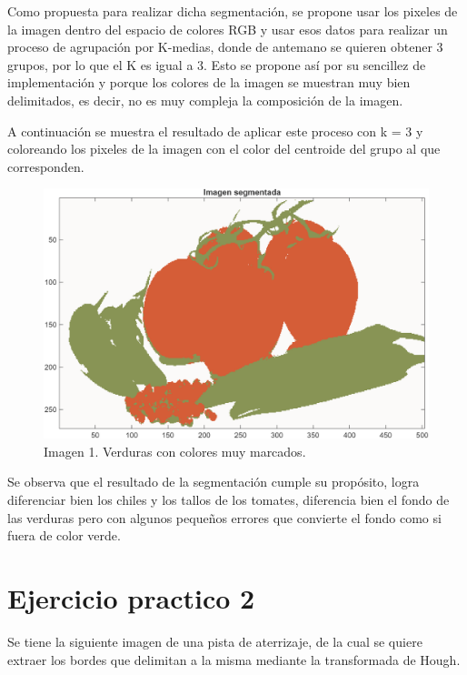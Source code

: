 \documentclass[11pt, letterpaper]{article}
\begin{document}
Como propuesta para realizar dicha segmentación, se propone usar los pixeles de la imagen dentro del espacio de colores RGB y usar esos datos para realizar un proceso de agrupación por K-medias, donde de antemano se quieren obtener 3 grupos, por lo que el K es igual a 3. Esto se propone así por su sencillez de implementación y porque los colores de la imagen se muestran muy bien delimitados, es decir, no es muy compleja la composición de la imagen.

\newpage

A continuación se muestra el resultado de aplicar este proceso con k = 3 y coloreando los pixeles de la imagen con el color del centroide del grupo al que corresponden.

\begin{figure}[h!]
	\centering
	\begin{minipage}{0.8\textwidth}
		\centering
		\includegraphics[width=\textwidth]{IMG/R1.png}
		\caption*{Imagen 1. Verduras con colores muy marcados.}
	\end{minipage}\hfill
\end{figure}

Se observa que el resultado de la segmentación cumple su propósito, logra diferenciar bien los chiles y los tallos de los tomates, diferencia bien el fondo de las verduras pero con algunos pequeños errores que convierte el fondo como si fuera de color verde.

\newpage

\section{Ejercicio practico 2}

Se tiene la siguiente imagen de una pista de aterrizaje, de la cual se quiere extraer los bordes que delimitan a la misma mediante la transformada de Hough.
\end{document}
